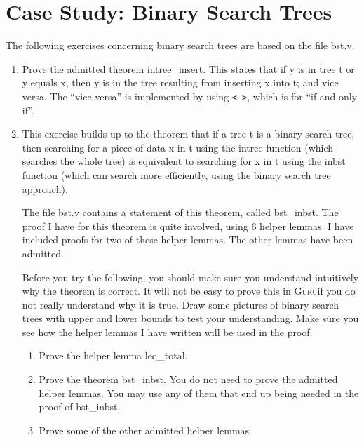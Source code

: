 \documentclass{book}[12pt]
\newcommand{\guru}[0]{\textsc{Guru}}
\begin{document}
\section{Case Study: Binary Search Trees}
                                                                             
The following exercises concerning binary search trees are based on
the file bst.v.

\begin{enumerate}

\item Prove the admitted theorem intree\_insert.  This states that if y
is in tree t or y equals x, then y is in the tree resulting from
inserting x into t; and vice versa.  The ``vice versa'' is implemented
by using \texttt{<-->}, which is for ``if and only if''.

\item This exercise builds up to the theorem that if a tree t is a
binary search tree, then searching for a piece of data x in t using
the intree function (which searches the whole tree) is equivalent to
searching for x in t using the inbst function (which can search more
efficiently, using the binary search tree approach).
                                                                              
The file bst.v contains a statement of this theorem, called
bst\_inbst.  The proof I have for this theorem is quite involved,
using 6 helper lemmas.  I have included proofs for two of these helper
lemmas.  The other lemmas have been admitted.
                                                                              
Before you try the following, you should make sure you understand
intuitively why the theorem is correct.  It will not be easy to prove
this in \guru if you do not really understand why it is true.  Draw some
pictures of binary search trees with upper and lower bounds to test
your understanding.  Make sure you see how the helper lemmas I have
written will be used in the proof.

\begin{enumerate}                                                
\item Prove the helper lemma leq\_total.

\item Prove the theorem bst\_inbst.  You do not need to prove the
admitted helper lemmas.  You may use any of them that end up being
needed in the proof of bst\_inbst.
                                                                               
\item Prove some of the other admitted helper lemmas.

\end{enumerate}
\end{enumerate}
\end{document}
